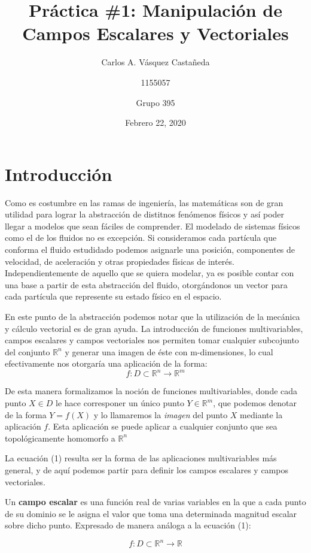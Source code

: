 \documentclass[12pt, letterpaper]{article}
\title{Práctica \#1: Manipulación de Campos Escalares y Vectoriales}
\author{Carlos A. Vásquez Castañeda \and 1155057 \and Grupo 395}
\date{Febrero 22, 2020}
\begin{document}
\maketitle
\section*{Introducción}
Como es costumbre en las ramas de ingeniería, las matemáticas son de gran utilidad para lograr la abstracción de distitnos fenómenos físicos y así poder llegar a modelos que sean fáciles de comprender. El modelado de sistemas físicos como el de los fluidos no es excepción. Si consideramos cada partícula que conforma el fluido estudidado podemos asignarle una posición, componentes de velocidad, de aceleración y otras propiedades físicas de interés. Independientemente de aquello que se quiera modelar, ya es posible contar con una base a partir de esta abstracción del fluido, otorgándonos un vector para cada partícula que represente su estado físico en el espacio. 

En este punto de la abstracción podemos notar que la utilización de la mecánica y cálculo vectorial es de gran ayuda. La introducción de funciones multivariables, campos escalares y campos vectoriales nos permiten tomar cualquier subcojunto del conjunto $\mathbb{R}^n$ y generar una imagen de éste con m-dimensiones, lo cual efectivamente nos otorgaría una aplicación de la forma:
\begin{equation}
	f : D \subset \mathbb{R}^n \rightarrow \mathbb{R}^m
\end{equation}

De esta manera formalizamos la noción de funciones multivariables, donde cada punto $X \in D$ le hace corresponer un único punto $Y \in \mathbb{R}^m$, que  podemos denotar de la forma $Y = f(X)$ y lo llamaremos la \textit{imagen} del punto $X$ mediante la aplicación $f$. Esta aplicación se puede aplicar a cualquier conjunto que sea topológicamente homomorfo a $\mathbb{R}^n$

La ecuación (1) resulta ser la forma de las aplicaciones multivariables más general, y de aquí podemos partir para definir los campos escalares y campos vectoriales.

Un \textbf{campo escalar} es una función real de varias variables en la que a cada punto de su dominio se le asigna el valor que toma una determinada magnitud escalar sobre dicho punto. Expresado de manera análoga a la ecuación (1):

\begin{equation}
	f : D \subset \mathbb{R}^n \rightarrow \mathbb{R}
\end{equation}
\end{document}
